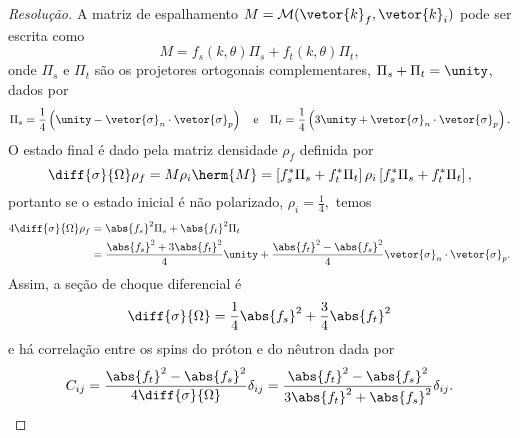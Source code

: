 \begin{proof}[Resolução]
   A matriz de espalhamento \(M = \mathcal{M}(\vetor{k}_f,\vetor{k}_i)\) pode ser escrita como
   \begin{equation*}
      M = f_s(k,\theta) \Pi_s + f_t(k,\theta) \Pi_t,
   \end{equation*}
   onde \(\Pi_s\) e \(\Pi_t\) são os projetores ortogonais complementares, \(\Pi_s + \Pi_t = \unity\), dados por
   \begin{equation*}
      \Pi_s = \frac14 \left(\unity - \vetor{\sigma}_n \cdot \vetor{\sigma}_p\right)
      \quad\text{e}\quad
      \Pi_t = \frac14 \left(3\unity + \vetor{\sigma}_n \cdot \vetor{\sigma}_p\right).
   \end{equation*}
   O estado final é dado pela matriz densidade \(\rho_f\) definida por
   \begin{equation*}
      \diff{\sigma}{\Omega}\rho_f = M\rho_i \herm{M} = \left[f_s^* \Pi_s + f_t^* \Pi_t\right]\rho_i\left[f_s^* \Pi_s + f_t^* \Pi_t\right],
   \end{equation*}
   portanto se o estado inicial é não polarizado, \(\rho_i = \frac14,\) temos
   \begin{align*}
      4\diff{\sigma}{\Omega} \rho_f &= \abs{f_s}^2 \Pi_s + \abs{f_t}^2\Pi_t\\
                                    &= \frac{\abs{f_s}^2 + 3\abs{f_t}^2}4 \unity + \frac{\abs{f_t}^2 - \abs{f_s}^2}{4} \vetor{\sigma}_n \cdot \vetor{\sigma}_p.
   \end{align*}
   Assim, a seção de choque diferencial é
   \begin{equation*}
      \diff{\sigma}{\Omega} = \frac14\abs{f_s}^2 + \frac34\abs{f_t}^2
   \end{equation*}
   e há correlação entre os spins do próton e do nêutron dada por
   \begin{equation*}
      C_{ij} = \frac{\abs{f_t}^2 - \abs{f_s}^2}{4 \diff{\sigma}{\Omega}}\delta_{ij} = \frac{\abs{f_t}^2 - \abs{f_s}^2}{3\abs{f_t}^2 + \abs{f_s}^2}\delta_{ij}.
   \end{equation*}


\end{proof}
